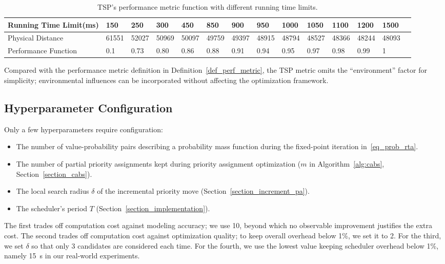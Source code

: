     \begin{table}[]
    \centering
    \caption{TSP's performance metric function with different running time limits.}
    \begin{tabular}{@{}llllllllllllll@{}}
        \toprule
        Running Time Limit(ms)       & 150   & 250   & 300   & 450   & 850   & 900   & 950   & 1000  & 1050  & 1100  & 1200  & 1500   \\ \midrule
        Physical Distance  & 61551 & 52027 & 50969 & 50097 & 49759 & 49397 & 48915 & 48794 & 48527 & 48366 & 48244 & 48093 \\
        Performance Function & 0.1   & 0.73  & 0.80 & 0.86  & 0.88  & 0.91  & 0.94  & 0.95  & 0.97  & 0.98  & 0.99  & 1        \\ \bottomrule
    \end{tabular}
    \label{table_tsp_perf}
    \end{table}

    Compared with the performance metric definition in Definition~\ref{def_perf_metric}, the TSP metric omits the ``environment'' factor for simplicity; environmental influences can be incorporated without affecting the optimization framework.

    \subsection{Hyperparameter Configuration}

    Only a few hyperparameters require configuration:
    \begin{itemize}
        \item The number of value-probability pairs describing a probability mass function during the fixed-point iteration in~\eqref{eq_prob_rta}.
        \item The number of partial priority assignments kept during priority assignment optimization ($m$ in Algorithm~\ref{alg:cabs}, Section~\ref{section_cabs}).
        \item The local search radius $\delta$ of the incremental priority move (Section~\ref{section_increment_pa}).
        \item The scheduler's period $T$ (Section~\ref{section_implementation}).
    \end{itemize}
    The first trades off computation cost against modeling accuracy; we use 10, beyond which no observable improvement justifies the extra cost.
    The second trades off computation cost against optimization quality; to keep overall overhead below 1\%, we set it to 2.
    For the third, we set $\delta$ so that only 3 candidates are considered each time.
    For the fourth, we use the lowest value keeping scheduler overhead below 1\%, namely 15~s in our real-world experiments.
